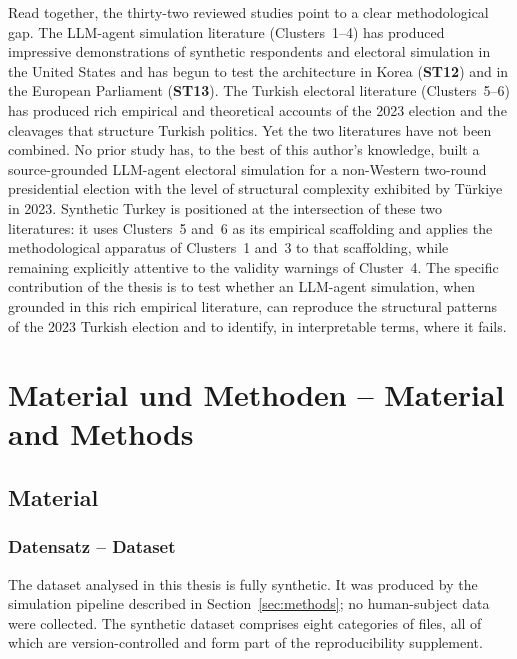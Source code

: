 \documentclass[12pt,a4paper]{report}
\begin{document}
Read together, the thirty-two reviewed studies point to a clear methodological gap. The LLM-agent simulation literature (Clusters~1--4) has produced impressive demonstrations of synthetic respondents and electoral simulation in the United States and has begun to test the architecture in Korea (\textbf{ST12}) and in the European Parliament (\textbf{ST13}). The Turkish electoral literature (Clusters~5--6) has produced rich empirical and theoretical accounts of the 2023 election and the cleavages that structure Turkish politics. Yet the two literatures have not been combined. No prior study has, to the best of this author's knowledge, built a source-grounded LLM-agent electoral simulation for a non-Western two-round presidential election with the level of structural complexity exhibited by T\"urkiye in 2023. Synthetic Turkey is positioned at the intersection of these two literatures: it uses Clusters~5 and~6 as its empirical scaffolding and applies the methodological apparatus of Clusters~1 and~3 to that scaffolding, while remaining explicitly attentive to the validity warnings of Cluster~4. The specific contribution of the thesis is to test whether an LLM-agent simulation, when grounded in this rich empirical literature, can reproduce the structural patterns of the 2023 Turkish election and to identify, in interpretable terms, where it fails.

\chapter{Material und Methoden -- Material and Methods}
\label{ch:methods}

\section{Material}
\label{sec:material}

\subsection{Datensatz -- Dataset}
\label{sec:dataset}

The dataset analysed in this thesis is fully synthetic. It was produced by the simulation pipeline described in Section~\ref{sec:methods}; no human-subject data were collected. The synthetic dataset comprises eight categories of files, all of which are version-controlled and form part of the reproducibility supplement.
\end{document}
